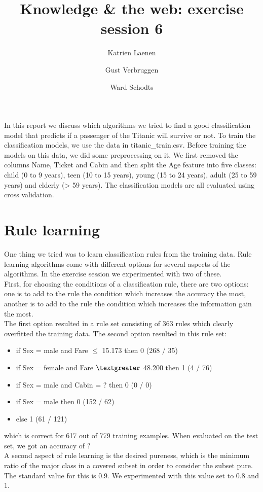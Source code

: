 \documentclass[12pt,a4paper]{article}
\author{
  Katrien Laenen\\
  \and
  Gust Verbruggen\\
  \and
  Ward Schodts
}
\title{Knowledge \& the web: exercise session 6}
\begin{document}
\maketitle
In this report we discuss which algorithms we tried to find a good classification model that predicts if a passenger of the Titanic will survive or not.
To train the classification models, we use the data in titanic_train.csv. Before training the models on this data, we did some preprocessing on it. We first removed the columns Name, Ticket and Cabin and then split the Age feature into five classes: child (0 to 9 years), teen (10 to 15 years), young (15 to 24 years), adult (25 to 59 years) and elderly (> 59 years). The classification models are all evaluated using cross validation.

\section{Rule learning}
One thing we tried was to learn classification rules from the training data.
Rule learning algorithms come with different options for several aspects of the algorithms. In the exercise session we experimented with two of these.\\
First, for choosing the conditions of a classification rule, there are two options: one is to add to the rule the condition which increases the accuracy the most, another is to add to the rule the condition which increases the information gain the most.\\
The first option resulted in a rule set consisting of 363 rules which clearly overfitted the training data.
The second option resulted in this rule set:
\begin{itemize}

\item if Sex = male and Fare $\leq$ 15.173 then 0  (268 / 35)
\item if Sex = female and Fare $\textgreater$ 48.200 then 1  (4 / 76)
\item if Sex = male and Cabin = ? then 0  (0 / 0)
\item if Sex = male then 0  (152 / 62)
\item else 1  (61 / 121)

\end{itemize}
which is correct for 617 out of 779 training examples.
When evaluated on the test set, we got an accuracy of ?\\
A second aspect of rule learning is the desired pureness, which is the minimum ratio of the major class in a covered subset in order to consider the subset pure. The standard value for this is 0.9. We experimented with this value set to 0.8 and 1.
\end{document}
